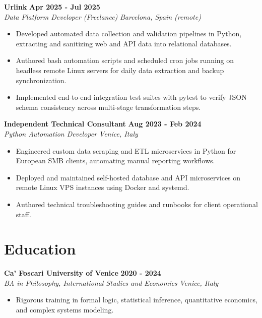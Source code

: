 \documentclass[10pt,a4paper]{article}
\newcommand{\role}[4]{%
  \textbf{#1} \hfill \textbf{#2}\\[1pt]%
  \textit{#3} \hfill \textit{#4}\\[2pt]%
}
\begin{document}
\role{Urlink}{Apr 2025 - Jul 2025}{Data Platform Developer (Freelance)}{Barcelona, Spain (remote)}
\begin{itemize}
  \item Developed automated data collection and validation pipelines in Python, extracting and sanitizing web and API data into relational databases.
  \item Authored bash automation scripts and scheduled cron jobs running on headless remote Linux servers for daily data extraction and backup synchronization.
  \item Implemented end-to-end integration test suites with pytest to verify JSON schema consistency across multi-stage transformation steps.
\end{itemize}

\role{Independent Technical Consultant}{Aug 2023 - Feb 2024}{Python Automation Developer}{Venice, Italy}
\begin{itemize}
  \item Engineered custom data scraping and ETL microservices in Python for European SMB clients, automating manual reporting workflows.
  \item Deployed and maintained self-hosted database and API microservices on remote Linux VPS instances using Docker and systemd.
  \item Authored technical troubleshooting guides and runbooks for client operational staff.
\end{itemize}

\section{Education}
\role{Ca' Foscari University of Venice}{2020 - 2024}{BA in Philosophy, International Studies and Economics}{Venice, Italy}
\begin{itemize}
  \item Rigorous training in formal logic, statistical inference, quantitative economics, and complex systems modeling.
\end{itemize}
\end{document}

